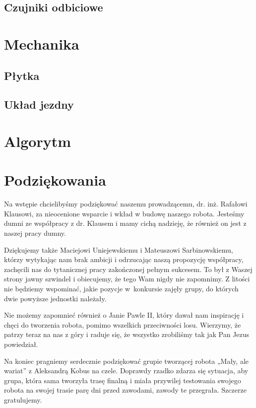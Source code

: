 \documentclass{article}
\begin{document}
\subsection{Czujniki odbiciowe}


\section{Mechanika}

\subsection{Płytka}


\subsection{Układ jezdny}


\section{Algorytm}


\section{Podziękowania}

Na wstępie chcielibyśmy podziękować naszemu prowadzącemu, dr. inż. Rafałowi Klausowi,  za nieocenione wsparcie i wkład w budowę naszego robota. Jesteśmy dumni ze współpracy z dr. Klausem i mamy cichą nadzieję, że również on jest z naszej pracy dumny.

Dziękujemy także Maciejowi Uniejewskiemu i Mateuszowi Sarbinowskiemu, którzy wytykając nam brak ambicji i odrzucając naszą propozycję współpracy, zachęcili nas do tytanicznej pracy zakończonej pełnym sukcesem. To był z Waszej strony jawny szwindel i obiecujemy, że tego Wam nigdy nie zapomnimy. Z litości nie będziemy wspominać, jakie pozycje w~konkursie zajęły grupy, do których dwie powyższe jednostki należały.

Nie możemy zapomnieć również o Janie Pawle II, który dawał nam inspirację i chęci do tworzenia robota, pomimo wszelkich przeciwności losu. Wierzymy, że patrzy teraz na nas z góry i raduje się, że wszystko zrobiliśmy tak jak Pan Jezus powiedział.

Na koniec pragniemy serdecznie podziękować grupie tworzącej robota „Mały, ale wariat” z Aleksandrą Kobus na czele. Doprawdy rzadko zdarza się sytuacja, aby grupa, która sama tworzyła trasę finalną i miała przywilej testowania swojego robota na swojej trasie parę dni przed zawodami, zawody te przegrała. Szczerze gratulujemy.
\end{document}
